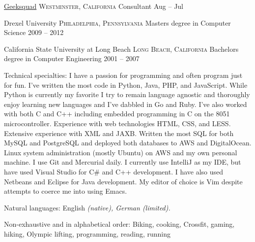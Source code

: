 \documentclass[10pt,a4paper]{article}
\begin{document}
\headedsection
  {\href{http://www.geeksquad.com/}{Geeksquad}}
  {\textsc{Westminster, California}} {%
  \headedsubsection
  { Consultant}
    {Aug -- Jul}
    {}
}



\spacedhrule{-0.2em}{-0.4em}


\headedsection
  {Drexel University}
  {\textsc{Philadelphia, Pennsylvania}} {%
  \headedsubsection
    {Masters degree in Computer Science}
    {2009 -- 2012}
    {}
}

\headedsection
  {California State University at Long Beach}
  {\textsc{Long Beach, California}} {%
  \headedsubsection
    {Bachelors degree in Computer Engineering}
    {2001 -- 2007} 
    {}
}

\spacedhrule{0.5em}{-0.4em}


\inlineheadsection  %
  {Technical specialties:}
  {I have a passion for programming and often program just for fun. I've written the
  most code in Python, Java, PHP, and JavaScript. While Python is currently my 
  favorite I try to remain language agnostic and thoroughly enjoy learning new
  languages and I've dabbled in {Go} and {Ruby}. I've also worked with both C and C++ including embedded programming
  in C on the 8051 microcontroller. Experience with web 
  technologies {HTML}, {CSS}, and {LESS}. Extensive experience with
  {XML} and {JAXB}. Written the most {SQL} for both {MySQL} and {PostgreSQL} and
  deployed both databases to {AWS} and {DigitalOcean}. Linux system
  administration (mostly Ubuntu) on {AWS} and my own personal machine. 
  I use {Git} and Mercurial daily. I currently use IntelliJ as my IDE, but have used Visual 
  Studio for {C\#} and {C++} development. I have also used {Netbeans} and 
  {Eclipse} for Java development. My editor of choice is Vim despite 
  attempts to coerce me into using Emacs.}

\inlineheadsection
  {Natural languages:}
  {English \emph{(native), German \emph{(limited)}.}}


\spacedhrule{1.6em}{-0.4em}


\inlineheadsection
  {Non-exhaustive and in alphabetical order:}
  {Biking, cooking, Crossfit, gaming, hiking, Olympic lifting, programming, reading, running}
\end{document}
